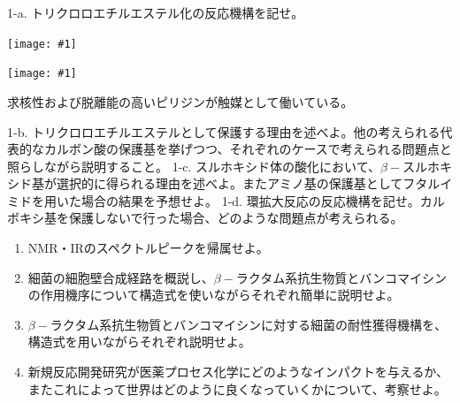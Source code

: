 \documentclass[a4paper,papersize,dvipdfmx]{jsarticle}
\newcommand{\pict}[2]{\begin{center} \texttt{[image: \#1]} \end{center}}   %
\begin{document}
1-a. トリクロロエチルエステル化の反応機構を記せ。
\pict{imgs-k/hk1.jpeg}{10}
\pict{imgs-k/hk2.jpeg}{10}
求核性および脱離能の高いピリジンが触媒として働いている。

1-b. トリクロロエチルエステルとして保護する理由を述べよ。他の考えられる代表的なカルボン酸の保護基を挙げつつ、それぞれのケースで考えられる問題点と照らしながら説明すること。
1-c. スルホキシド体の酸化において、$\beta -$スルホキシド基が選択的に得られる理由を述べよ。またアミノ基の保護基としてフタルイミドを用いた場合の結果を予想せよ。
1-d. 環拡大反応の反応機構を記せ。カルボキシ基を保護しないで行った場合、どのような問題点が考えられる。
\begin{enumerate}
\item NMR・IRのスペクトルピークを帰属せよ。
\item 細菌の細胞壁合成経路を概説し、$\beta -$ラクタム系抗生物質とバンコマイシンの作用機序について構造式を使いながらそれぞれ簡単に説明せよ。
\item $\beta -$ラクタム系抗生物質とバンコマイシンに対する細菌の耐性獲得機構を、構造式を用いながらそれぞれ説明せよ。
\item 新規反応開発研究が医薬プロセス化学にどのようなインパクトを与えるか、またこれによって世界はどのように良くなっていくかについて、考察せよ。
\end{enumerate}
\end{document}
